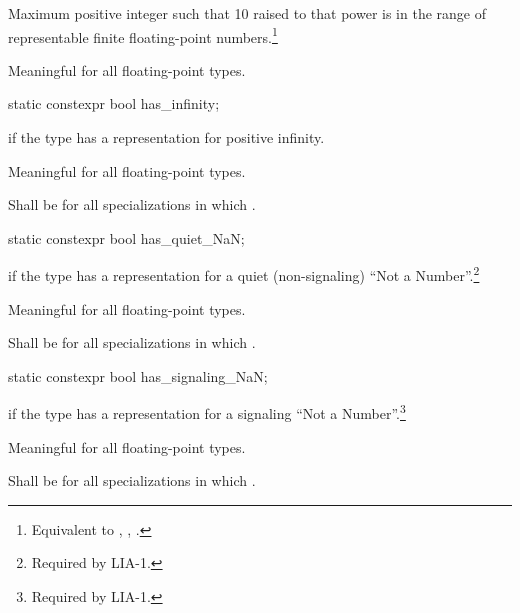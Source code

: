 \begin{itemdescr}
\pnum
Maximum positive integer such that 10 raised to that power is in the
range of representable finite floating-point numbers.\footnote{Equivalent to
, , .}

\pnum
Meaningful for all floating-point types.
\end{itemdescr}

%
\begin{itemdecl}
static constexpr bool has_infinity;
\end{itemdecl}

\begin{itemdescr}
\pnum
{} if the type has a representation for positive infinity.

\pnum
Meaningful for all floating-point types.

\pnum
Shall be
for all specializations in which
.
\end{itemdescr}

%
\begin{itemdecl}
static constexpr bool has_quiet_NaN;
\end{itemdecl}

\begin{itemdescr}
\pnum
{} if the type has a representation for a quiet (non-signaling) ``Not a
Number''.\footnote{Required by LIA-1.}

\pnum
Meaningful for all floating-point types.

\pnum
Shall be
for all specializations in which
.
\end{itemdescr}

%
\begin{itemdecl}
static constexpr bool has_signaling_NaN;
\end{itemdecl}

\begin{itemdescr}
\pnum
{} if the type has a representation for a signaling ``Not a Number''.\footnote{Required by LIA-1.}

\pnum
Meaningful for all floating-point types.

\pnum
Shall be
for all specializations in which
.
\end{itemdescr}

